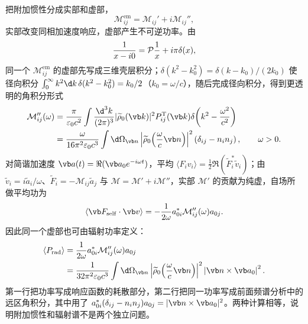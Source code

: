 把附加惯性分成实部和虚部，
\begin{equation*}
 \mathcal M_{ij}^{\mathrm{em}}
 =\mathcal M_{ij}'+i\mathcal M_{ij}'',
\end{equation*}
实部改变同相加速度响应，虚部产生不可逆功率。由
\begin{equation*}
 {1\over x-i0}=\mathcal P{1\over x}+i\pi\delta(x),
\end{equation*}
同一个 $\mathcal M_{ij}^{\mathrm{em}}$ 的虚部先写成三维壳层积分；$\delta(k^2-k_0^2)=\delta(k-k_0)/(2k_0)$ 使径向积分 $\int_0^\infty k^2\d k\,\delta(k^2-k_0^2)=k_0/2$（$k_0=\omega/c$），随后完成径向积分，得到更透明的角积分形式
\begin{align*}
 \mathcal M_{ij}''(\omega)
 &= {\pi\over\varepsilon_0c^2}
 \int{\d^3k\over(2\pi)^3}
 |\widetilde\rho_0(\vb k)|^2P_{ij}^{\mathrm T}(\vb k)
 \delta\!\left(k^2-{\omega^2\over c^2}\right)\\
 &= {\omega\over16\pi^2\varepsilon_0c^3}
 \int\d\Omega_{\vb n}
 \left|\widetilde\rho_0\!\left({\omega\over c}\vb n\right)\right|^2
 \left(\delta_{ij}-n_i n_j\right),
 \qquad \omega>0.
\end{align*}
对简谐加速度 $\vb a(t)=\Re(\vb a_0e^{-i\omega t})$，平均 $\langle F_iv_i\rangle=\frac12\Re(\widetilde F_i^*\widetilde v_i)$；由 $\widetilde v_i=i\widetilde a_i/\omega$、$\widetilde F_i=-\mathcal M_{ij}\widetilde a_j$ 与 $\mathcal M=\mathcal M'+i\mathcal M''$，实部 $\mathcal M'$ 的贡献为纯虚，自场所做平均功为
\begin{equation*}
 \left\langle\vb F_{\mathrm{self}}\cdot\vb v\right\rangle
 =-{1\over2\omega}a_{0i}^*\mathcal M_{ij}''(\omega)a_{0j}.
\end{equation*}
因此同一个虚部也可由辐射功率定义：
\begin{align*}
 \left\langle P_{\mathrm{rad}}\right\rangle
 &={1\over2\omega}a_{0i}^*\mathcal M_{ij}''(\omega)a_{0j}\\
 &={1\over32\pi^2\varepsilon_0c^3}
 \int\d\Omega_{\vb n}
 \left|\widetilde\rho_0\!\left({\omega\over c}\vb n\right)\right|^2
 \left|\vb n\times\vb a_0\right|^2.
\end{align*}
第一行把功率写成响应函数的耗散部分，第二行把同一功率写成前面频谱分析中的远区角积分，其中用了 $a_{0i}^*(\delta_{ij}-n_in_j)a_{0j}=|\vb n\times\vb a_0|^2$。两种计算相等，说明附加惯性和辐射谱不是两个独立问题。

